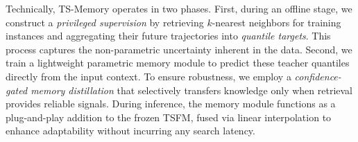 







Technically, TS-Memory operates in two phases. First, during an offline stage, we construct a \textit{privileged supervision} by retrieving $k$-nearest neighbors for training instances and aggregating their future trajectories into \emph{quantile targets}. This process captures the non-parametric uncertainty inherent in the data. Second, we train a lightweight parametric memory module to predict these teacher quantiles directly from the input context. To ensure robustness, we employ a \textit{confidence-gated memory distillation} that selectively transfers knowledge only when retrieval provides reliable signals. During inference, the memory module functions as a plug-and-play addition to the frozen TSFM, fused via linear interpolation to enhance adaptability without incurring any search latency.

